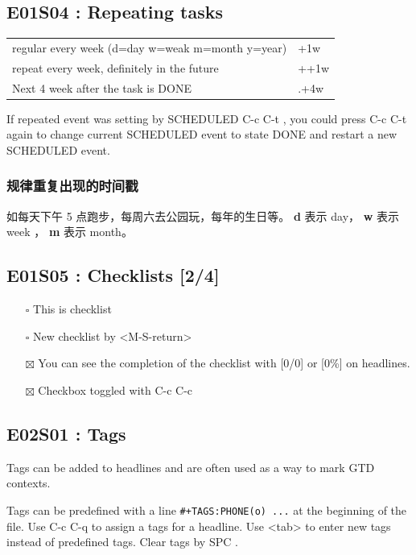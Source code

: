 \documentclass[11pt]{article}
\begin{document}
\subsection{E01S04 : Repeating tasks}
\label{sec:org0df608f}
\begin{center}
\begin{tabular}{ll}
regular every week (d=day w=weak m=month y=year) & +1w\\
repeat every week, definitely in the future & ++1w\\
Next 4 week after the task is DONE & .+4w\\
\end{tabular}
\end{center}

If repeated event was setting by SCHEDULED  C-c C-t
 , you could press  C-c C-t 
again to change current SCHEDULED event to state DONE and restart a new
SCHEDULED event.

\subsubsection{规律重复出现的时间戳}
\label{sec:orgfd2a0d9}
如每天下午 5 点跑步，每周六去公园玩，每年的生日等。
\textbf{d} 表示 day， \textbf{w} 表示 week ， \textbf{m} 表示 month。
\subsection{E01S05 : Checklists [2/4]}
\label{sec:orgae3d644}
\begin{itemize}
\item[{$\square$}] This is checklist
\item[{$\square$}] New checklist by  <M-S-return>
\item[{$\boxtimes$}] You can see the completion of the checklist with [0/0] or [0\%] on headlines.
\item[{$\boxtimes$}] Checkbox toggled with  C-c C-c
\end{itemize}
\subsection{E02S01 : Tags}
\label{sec:org1095237}
Tags can be added to headlines and are often used as a way to mark GTD contexts.

Tags can be predefined with a line \texttt{\#+TAGS:PHONE(o) ...} at the beginning of
the file. Use  C-c C-q  to assign a tags for a
headline. Use  <tab>  to enter new tags instead
of predefined tags. Clear tags by  SPC  .
\end{document}
